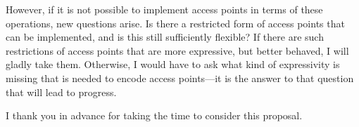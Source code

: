 \documentclass{scrartcl}
\begin{document}
However, if it is not possible to implement access points in terms of
these operations, new questions arise. Is there a restricted form of
access points that can be implemented, and is this still sufficiently
flexible? If there are such restrictions of access points that are
more expressive, but better behaved, I will gladly take them.
Otherwise, I would have to ask what kind of expressivity is missing
that is needed to encode access points---it is the answer to that
question that will lead to progress.

\vspace{5mm}

I thank you in advance for taking the time to consider this proposal.

%
%
\end{document}
